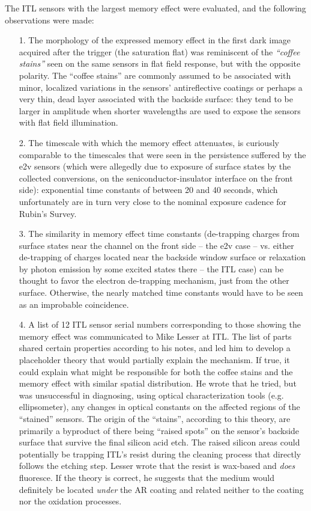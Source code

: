 The ITL sensors with the largest memory effect were evaluated, and the following observations were made:
\begin{itemize}
    \item[1.] The morphology of the expressed memory effect in the first dark image acquired after the trigger (the saturation flat) was reminiscent of the {\it ``coffee stains''} seen on the same sensors in flat field response, but with the opposite polarity. The ``coffee stains'' are commonly assumed to be associated with minor, localized variations in the sensors' antireflective coatings or perhaps a very thin, dead layer associated with the backside surface: they tend to be larger in amplitude when shorter wavelengths are used to expose the sensors with flat field illumination.
    \item[2.] The timescale with which the memory effect attenuates, is curiously comparable to the timescales that were seen in the persistence suffered by the e2v sensors (which were allegedly due to exposure of surface states by the collected conversions, on the seniconductor-insulator interface on the front side): exponential time constants of between 20 and 40 seconds, which unfortunately are in turn very close to the nominal exposure cadence for Rubin's Survey.
    \item[3.] The similarity in memory effect time constants (de-trapping charges from surface states near the channel on the front side -- the e2v case -- vs. either de-trapping of charges located near the backside window surface or relaxation by photon emission by some excited states there -- the ITL case) can be thought to favor the electron de-trapping mechanism, just from the other surface. Otherwise, the nearly matched time constants would have to be seen as an improbable coincidence.
    \item[4.] A list of 12 ITL sensor serial numbers corresponding to those showing the memory effect was communicated to Mike Lesser at ITL. The list of parts shared certain properties according to his notes, and led him to develop a placeholder theory that would partially explain the mechanism. If true, it could explain what might be responsible for both the coffee stains and the memory effect with similar spatial distribution. He wrote that he tried, but was unsuccessful in diagnosing, using optical characterization tools (e.g. ellipsometer), any changes in optical constants on the affected regions of the ``stained'' sensors. The origin of the ``stains'', according to this theory, are primarily a byproduct of there being ``raised spots'' on the sensor's backside surface that survive the final silicon acid etch. The raised silicon areas could potentially be trapping ITL's resist during the cleaning process that directly follows the etching step. Lesser wrote that the resist is wax-based and {\it does} fluoresce. If the theory is correct, he suggests that the medium would definitely be located {\it under} the AR coating and related neither to the coating nor the oxidation processes.

\end{itemize}
